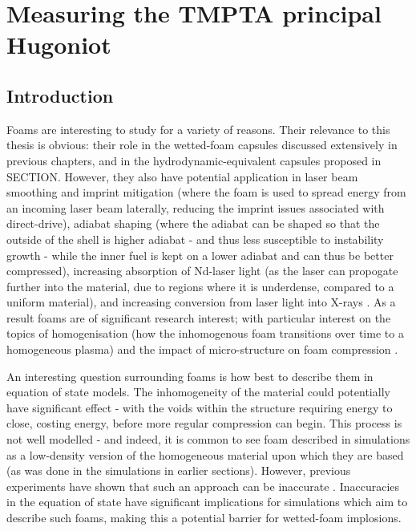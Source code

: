 

\chapter{\label{ch-experiment}Measuring the TMPTA principal Hugoniot}

\minitoc

\section{Introduction}

Foams are interesting to study for a variety of reasons. Their relevance to this thesis is obvious: their role in the wetted-foam capsules discussed extensively in previous chapters, and in the hydrodynamic-equivalent capsules proposed in SECTION. However, they also have potential application in laser beam smoothing and imprint mitigation \cite{Depierreux2009, Hu2018} (where the foam is used to spread energy from an incoming laser beam laterally, reducing the imprint issues associated with direct-drive), adiabat shaping \cite{Craxton2015, Bodner1998, Collins2005} (where the adiabat can be shaped so that the outside of the shell is higher adiabat - and thus less susceptible to instability growth - while the inner fuel is kept on a lower adiabat and can thus be better compressed), increasing absorption of Nd-laser light \cite{Skupsky2004} (as the laser can propogate further into the material, due to regions where it is underdense, compared to a uniform material), and increasing conversion from laser light into X-rays \cite{Shang2016}. As a result foams are of significant research interest; with particular interest on the topics of homogenisation (how the inhomogenous foam transitions over time to a homogeneous plasma) and the impact of micro-structure on foam compression \cite{Hazak1998, Cipriani2021, Cipriani2018a, Colvin2013}.

An interesting question surrounding foams is how best to describe them in equation of state models. The inhomogeneity of the material could potentially have significant effect - with the voids within the structure requiring energy to close, costing energy, before more regular compression can begin. This process is not well modelled - and indeed, it is common to see foam described in simulations as a low-density version of the homogeneous material upon which they are based (as was done in the simulations in earlier sections). However, previous experiments have shown that such an approach can be inaccurate \cite{Nicolai2012}. Inaccuracies in the equation of state have significant implications for simulations which aim to describe such foams, making this a potential barrier for wetted-foam implosions.

